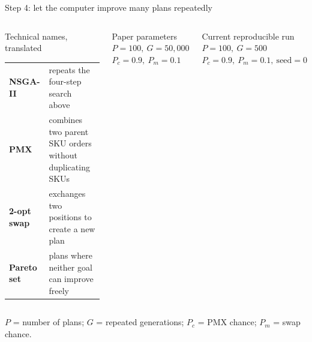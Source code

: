 \documentclass[aspectratio=169,10pt]{beamer}
\begin{document}
\begin{frame}{Step 4: let the computer improve many plans repeatedly}
  \centering
  \vspace{0.35cm}
  \begin{columns}[T,onlytextwidth]
    \begin{block}{Technical names, translated}
      \scriptsize
      \begin{tabular}{@{}p{}p{}@{}}
        \textbf{NSGA-II} & repeats the four-step search above\\
        \textbf{PMX} & combines two parent SKU orders without duplicating SKUs\\
        \textbf{2-opt swap} & exchanges two positions to create a new plan\\
        \textbf{Pareto set} & plans where neither goal can improve freely\\
      \end{tabular}
    \end{block}
    \begin{block}{Paper parameters}
      \centering\small
      $P=100,\ G=50{,}000$\\
      $P_c=0.9,\ P_m=0.1$
    \end{block}
    \begin{alertblock}{Current reproducible run}
      \centering\small
      $P=100,\ G=500$\\
      $P_c=0.9,\ P_m=0.1,\ \text{seed}=0$
    \end{alertblock}
  \end{columns}
  {\tiny $P$ = number of plans; $G$ = repeated generations; $P_c$ = PMX chance;
  $P_m$ = swap chance.}
\end{frame}
\end{document}
